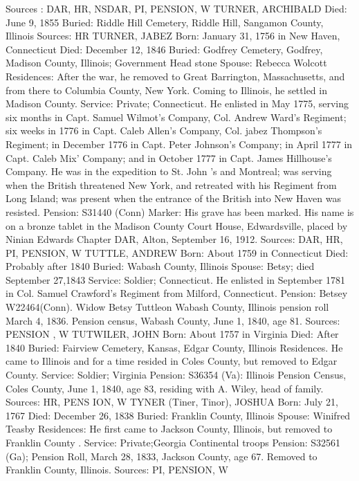 Sources : DAR, HR, NSDAR, PI, PENSION, W 
TURNER, ARCHIBALD 
Died: June 9, 1855
Buried: Riddle Hill Cemetery, Riddle Hill, Sangamon County, Illinois 
Sources: HR 
TURNER, JABEZ
Born: January 31, 1756 in New Haven, Connecticut
Died: December 12, 1846
Buried: Godfrey Cemetery, Godfrey, Madison County, Illinois; Government Head ­stone 
Spouse: Rebecca Wolcott 
Residences: After the war, he removed to Great Barrington, Massachusetts, and from there to Columbia County, New York. Coming to Illinois, he settled in Madison County. 
Service: Private; Connecticut. He enlisted in May 1775, serving six months in Capt. Samuel Wilmot's Company, Col. Andrew Ward's Regiment; six weeks in 1776 in Capt. Caleb Allen's Company, Col. jabez Thompson's Regiment; in December 1776 in Capt. Peter Johnson's Company; in April 1777 in Capt. Caleb Mix' Company; and in October 1777 in Capt. James Hillhouse's Com­pany.  He was in the expedition to St. John 's and Montreal; was serving when the British threatened New York, and retreated with his Regiment from Long Island; was present when the entrance of the British into New Haven was resisted. 
Pension: S31440 (Conn)
Marker: His grave has been marked. His name is on a bronze tablet in the Madison County Court House, Edwardsville, placed by Ninian Edwards Chapter DAR, Alton, September 16, 1912. 
Sources: DAR, HR, PI, PENSION, W 
TUTTLE, ANDREW
Born: About 1759 in Connecticut 
Died: Probably after 1840 
Buried: Wabash County, Illinois 
Spouse: Betsy; died September 27,1843 
Service: Soldier; Connecticut. He enlisted in September 1781 in Col. Samuel Crawford's Regiment from Milford, Connecticut. 
Pension: Betsey W22464(Conn). Widow Betsy Tuttleon Wabash County, Illinois pension roll March 4, 1836. Pension census, Wabash County, June 1, 1840, age 81.
Sources: PENSION , W 
TUTWILER, JOHN
Born: About 1757 in Virginia
Died: After 1840
Buried: Fairview Cemetery, Kansas, Edgar County, Illinois 
Residences. He came to Illinois and for a time resided in Coles County, but removed to Edgar County.
Service: Soldier; Virginia Pension: S36354 (Va): Illinois Pension Census, Coles County, June 1, 1840, age 83, residing with A. Wiley, head of family.
Sources: HR, PENS ION, W 
TYNER (Tiner, Tinor), JOSHUA
Born: July 21, 1767
Died: December 26, 1838
Buried: Franklin County, Illinois 
Spouse: Winifred Teasby 
Residences: He first came to Jackson County, Illinois, but removed to Franklin County .
Service: Private;Georgia Continental troops Pension: S32561 (Ga); Pension Roll, March 28, 1833, Jackson County, age 67. Re­moved to Franklin County, Illinois.
Sources: PI, PENSION, W 

